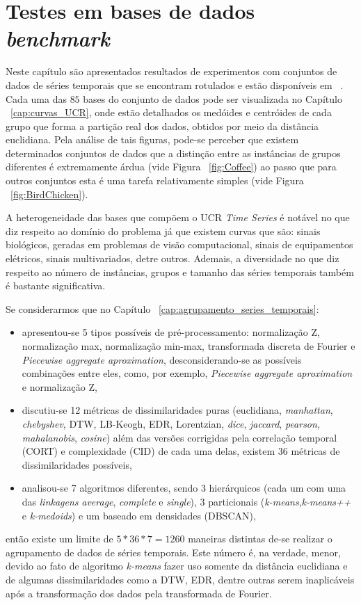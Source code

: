 \chapter{Testes em bases de dados \emph{benchmark}} \label{cap:testes_teoricos}

Neste capítulo são apresentados resultados de experimentos com conjuntos de dados de séries temporais que se encontram rotulados e estão disponíveis em ~\parencite{UCRArchive}. Cada uma das $85$ bases do conjunto de dados pode ser visualizada no Capítulo ~\ref{cap:curvas_UCR}, onde estão detalhados os medóides e centróides de cada grupo que forma a partição real dos dados, obtidos por meio da distância euclidiana. Pela análise de tais figuras, pode-se perceber que existem determinados conjuntos de dados que a distinção entre as instâncias de grupos diferentes é extremamente árdua (vide Figura ~\ref{fig:Coffee})  ao passo que para outros conjuntos esta é uma tarefa relativamente simples (vide Figura ~\ref{fig:BirdChicken}). 

A heterogeneidade das bases que compõem o UCR \emph{Time Series} é notável no que diz respeito ao domínio do problema já que existem curvas que são: sinais biológicos, geradas em problemas de visão computacional, sinais de equipamentos elétricos, sinais multivariados, detre outros. Ademais, a diversidade no que diz respeito ao número de instâncias, grupos e tamanho das séries temporais também é bastante significativa. 

Se considerarmos que no Capítulo ~\ref{cap:agrupamento_series_temporais}:

\begin{itemize}
	\item apresentou-se 5 tipos possíveis de pré-processamento: normalização Z, normalização max, normalização min-max, transformada discreta de Fourier e \emph{Piecewise aggregate aproximation}, desconsiderando-se as possíveis combinações entre eles, como, por exemplo, \emph{Piecewise aggregate aproximation} e normalização Z,
	\item discutiu-se 12 métricas de dissimilaridades puras (euclidiana, \emph{manhattan}, \emph{chebyshev}, DTW, LB-Keogh, EDR, Lorentzian, \emph{dice}, \emph{jaccard}, \emph{pearson}, \emph{mahalanobis}, \emph{cosine}) além das versões corrigidas pela correlação temporal (CORT) e complexidade (CID) de cada uma delas, existem 36 métricas de dissimilaridades  possíveis,
	\item analisou-se 7 algoritmos diferentes, sendo 3 hierárquicos (cada um com uma das \emph{linkagens }\emph{average}, \emph{complete} e \emph{single}), 3 particionais (\emph{k-means},\emph{k-means++} e \emph{k-medoids}) e um baseado em densidades (DBSCAN),
\end{itemize}
 então existe um limite de $5*36*7=1260$ maneiras distintas de-se realizar o agrupamento de dados de séries temporais. Este número é, na verdade, menor, devido ao fato de algoritmo \emph{k-means} fazer uso somente da distância euclidiana e de algumas dissimilaridades como a DTW, EDR, dentre outras serem inaplicáveis após a transformação dos dados pela transformada de Fourier. 
 
